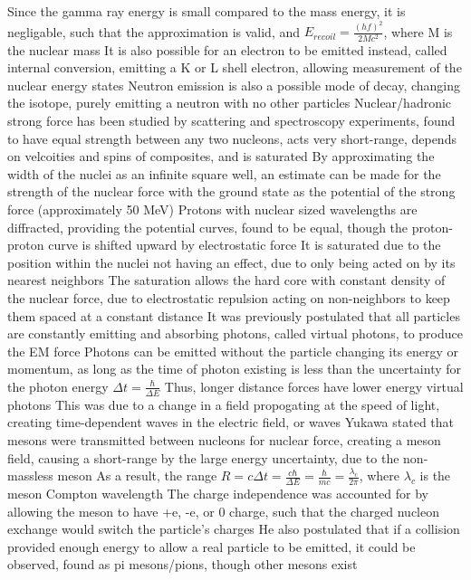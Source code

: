 \documentclass[11 pt, twoside]{article}
\newenvironment{outline*}
{
	\begin{outline}[enumerate]
	}
	{\end{outline}
}
\begin{document}
\begin{outline*}
			\4 Since the gamma ray energy is small compared to the mass energy, it is negligable, such that the approximation is valid, and $E_{recoil} = \frac{(hf)^2}{2Mc^2}$, where M is the nuclear mass
		\3 It is also possible for an electron to be emitted instead, called internal conversion, emitting a K or L shell electron, allowing measurement of the nuclear energy states
	\2 Neutron emission is also a possible mode of decay, changing the isotope, purely emitting a neutron with no other particles
\1 Nuclear/hadronic strong force has been studied by scattering and spectroscopy experiments, found to have equal strength between any two nucleons, acts very short-range, depends on velcoities and spins of composites, and is saturated
	\2 By approximating the width of the nuclei as an infinite square well, an estimate can be made for the strength of the nuclear force with the ground state as the potential of the strong force (approximately 50 MeV)
	\2 Protons with nuclear sized wavelengths are diffracted, providing the potential curves, found to be equal, though the proton-proton curve is shifted upward by electrostatic force
		\3 It is saturated due to the position within the nuclei not having an effect, due to only being acted on by its nearest neighbors
		\3 The saturation allows the hard core with constant density of the nuclear force, due to electrostatic repulsion acting on non-neighbors to keep them spaced at a constant distance
	\2 It was previously postulated that all particles are constantly emitting and absorbing photons, called virtual photons, to produce the EM force
		\3 Photons can be emitted without the particle changing its energy or momentum, as long as the time of photon existing is less than the uncertainty for the photon energy $\Delta t = \frac{\hbar}{\Delta E}$
			\4 Thus, longer distance forces have lower energy virtual photons
			\4 This was due to a change in a field propogating at the speed of light, creating time-dependent waves in the electric field, or waves
		\3 Yukawa stated that mesons were transmitted between nucleons for nuclear force, creating a meson field, causing a short-range by the large energy uncertainty, due to the non-massless meson
			\4 As a result, the range $R = c\Delta t = \frac{c\hbar}{\Delta E} = \frac{\hbar}{mc} = \frac{\lambda_c}{2\pi}$, where $\lambda_c$ is the meson Compton wavelength
			\4 The charge independence was accounted for by allowing the meson to have +e, -e, or 0 charge, such that the charged nucleon exchange would switch the particle's charges
			\4 He also postulated that if a collision provided enough energy to allow a real particle to be emitted, it could be observed, found as pi mesons/pions, though other mesons exist

\end{outline*}
\end{document}
